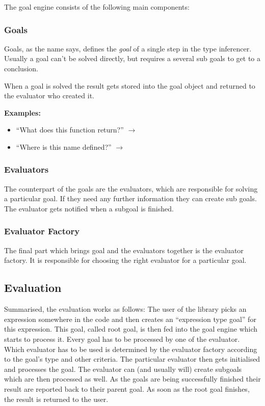 \documentclass[12pt,halfparskip,DIV11,BCOR10mm]{scrreprt}
\begin{document}
The goal engine consists of the following main components:

\subsubsection{Goals}
Goals, as the name says, defines the \emph{goal} of a single step in the type inferencer. Usually a goal can't be solved directly, but requires a several sub goals to get to a conclusion.

When a goal is solved the result gets stored into the goal object and returned to the evaluator who created it.

\textbf{Examples:}

\begin{itemize}
	\item ``What does this function return?''  $\rightarrow$  
	\item ``Where is this name defined?'' $\rightarrow$ 
\end{itemize}

\subsubsection{Evaluators}


The counterpart of the goals are the evaluators, which are responsible for solving a particular goal. If they need any further information they can create sub goals. The evaluator gets notified when a subgoal is finished.

\subsubsection{Evaluator Factory}

The final part which brings goal and the evaluators together is the evaluator factory. It is responsible for choosing the right evaluator for a particular goal. 

\subsection{Evaluation}

Summarised, the evaluation works as follows: The user of the library picks an expression somewhere in the code and then creates an ``expression type goal'' for this expression. This goal, called root goal, is then fed into the goal engine which starts to process it. Every goal has to be processed by one of the evaluator. Which evaluator has to be used is determined by the evaluator factory according to the goal's type and other criteria. The particular evaluator then gets initialised and processes the goal. The evaluator can (and usually will) create subgoals which are then processed as well. As the goals are being successfully finished their result are reported back to their parent goal. As soon as the root goal finishes, the result is returned to the user.
\end{document}
